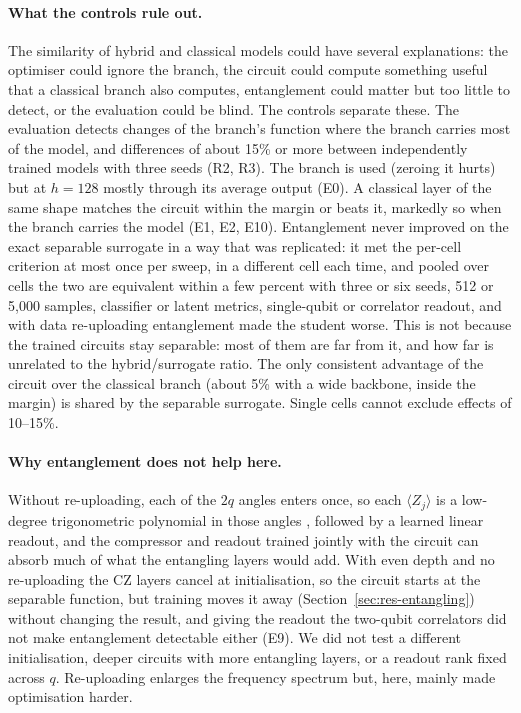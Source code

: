 \documentclass[11pt]{article}
\begin{document}
\paragraph{What the controls rule out.} The similarity of hybrid and classical
models could have several explanations: the optimiser could ignore the branch,
the circuit could compute something useful that a classical branch also computes,
entanglement could matter but too little to detect, or the evaluation could be
blind. The controls separate these. The evaluation detects changes of the branch's
function where the branch carries most of the model, and differences of about 15\%
or more between independently trained models with three seeds (R2, R3). The branch is used (zeroing it hurts) but
at $h=128$ mostly through its average output (E0). A classical layer of the same
shape matches the circuit within the margin or beats it, markedly so when the branch
carries the model (E1, E2, E10). Entanglement never improved on the exact separable
surrogate in a way that was replicated: it met the per-cell criterion at most once
per sweep, in a different cell each time, and pooled over cells the two are equivalent within
a few percent with three or six seeds, 512 or 5{,}000 samples, classifier or latent
metrics, single-qubit or correlator readout, and with data re-uploading
entanglement made the student worse. This is not because the trained circuits stay
separable: most of them are far from it, and how far is unrelated to the
hybrid/surrogate ratio. The only consistent advantage of the circuit
over the classical branch (about 5\% with a wide backbone, inside the margin) is
shared by the separable surrogate. Single cells cannot exclude effects of
10--15\%.

\paragraph{Why entanglement does not help here.} Without re-uploading, each of the
$2q$ angles enters once, so each $\langle Z_j\rangle$ is a low-degree trigonometric
polynomial in those angles \citep{schuld2021encoding}, followed by a learned linear
readout, and the compressor and readout trained jointly with the circuit can absorb
much of what the entangling layers would add. With even depth and no re-uploading
the CZ layers cancel at initialisation, so the circuit starts at the separable
function, but training moves it away (Section~\ref{sec:res-entangling}) without
changing the result, and giving the readout the two-qubit correlators did not make
entanglement detectable either (E9). We did not test a different initialisation, deeper circuits with more
entangling layers, or a readout rank fixed across $q$. Re-uploading enlarges the
frequency spectrum \citep{schuld2021encoding} but, here, mainly made optimisation
harder.
\end{document}
